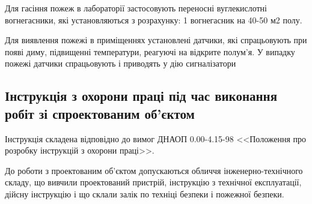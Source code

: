 Для гасіння пожеж в лабораторії застосовують переносні вуглекислотні вогнегасники, які установляються з розрахунку: 1 вогнегасник на 40-50 м2 полу.

Для виявлення пожежі в приміщеннях установлені датчики, які спрацьовують при появі диму, підвищенні температури, реагуючі на відкрите полум’я. У випадку пожежі датчики спрацьовують і приводять у дію сигналізатори

\subsection{Інструкція з охорони праці під час виконання робіт зі 
 спроектованим об'єктом}
Інструкція складена відповідно до вимог ДНАОП 0.00-4.15-98  <<Положення про розробку інструкцій з охорони праці>>.

До роботи з проектованим об'єктом допускаються обличчя інженерно-технічного складу, що вивчили проектований пристрій, інструкцію з технічної експлуатації, дійсну інструкцію і що склали залік по техніці безпеки і пожежної безпеки.
